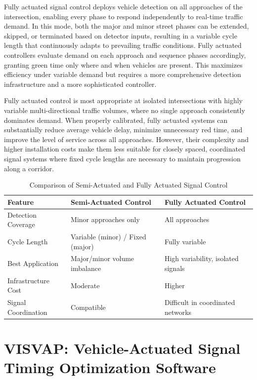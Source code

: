 Fully actuated signal control deploys vehicle detection on 
all approaches of the intersection, enabling every phase to 
respond independently to real-time traffic demand. In this 
mode, both the major and minor street phases can be extended, 
skipped, or terminated based on detector inputs, resulting in 
a variable cycle length that continuously adapts to prevailing 
traffic conditions. Fully actuated controllers evaluate demand 
on each approach and sequence phases accordingly, granting 
green time only where and when vehicles are present. This 
maximizes efficiency under variable demand but requires a 
more comprehensive detection infrastructure and a more 
sophisticated controller.

Fully actuated control is most appropriate at isolated intersections 
with highly variable multi-directional traffic volumes, where 
no single approach consistently dominates demand. When 
properly calibrated, fully actuated systems can substantially 
reduce average vehicle delay, minimize unnecessary red time, 
and improve the level of service across all approaches. 
However, their complexity and higher installation costs make 
them less suitable for closely spaced, coordinated signal 
systems where fixed cycle lengths are necessary to maintain 
progression along a corridor.

\begin{table}[h!]
    \centering
    \caption{Comparison of Semi-Actuated and Fully Actuated Signal Control}
    \begin{tabular}{|l|l|p{3cm}|}
        \hline
        Feature	& Semi-Actuated Control	& Fully Actuated Control \\
        \hline
        Detection Coverage	& Minor approaches only &	All approaches \\
        \hline
        Cycle Length &	Variable (minor) / Fixed (major)	& Fully variable \\
        \hline
        Best Application	& Major/minor volume imbalance &	High variability, isolated signals \\
        \hline
        Infrastructure Cost	& Moderate & Higher \\
        \hline
        Signal Coordination	& Compatible &	Difficult in coordinated networks \\
        \hline


    \end{tabular}
\end{table}

\section{VISVAP: Vehicle-Actuated Signal Timing Optimization Software}

